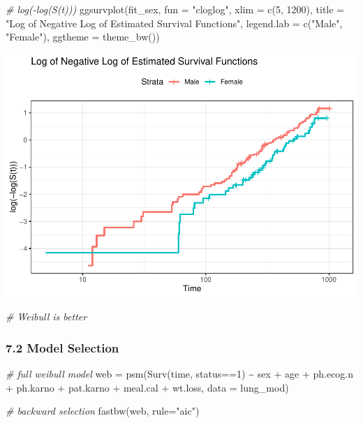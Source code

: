 \documentclass[
]{article}
\newenvironment{Shaded}{\begin{snugshade}}{\end{snugshade}}
\newcommand{\AttributeTok}[1]{\textcolor[rgb]{0.77,0.63,0.00}{#1}}
\newcommand{\CommentTok}[1]{\textcolor[rgb]{0.56,0.35,0.01}{\textit{#1}}}
\newcommand{\DecValTok}[1]{\textcolor[rgb]{0.00,0.00,0.81}{#1}}
\newcommand{\FunctionTok}[1]{\textcolor[rgb]{0.00,0.00,0.00}{#1}}
\newcommand{\NormalTok}[1]{#1}
\newcommand{\OtherTok}[1]{\textcolor[rgb]{0.56,0.35,0.01}{#1}}
\newcommand{\SpecialCharTok}[1]{\textcolor[rgb]{0.00,0.00,0.00}{#1}}
\newcommand{\StringTok}[1]{\textcolor[rgb]{0.31,0.60,0.02}{#1}}
\begin{document}
\begin{Shaded}
\begin{Highlighting}[]
\CommentTok{\# log({-}log(S(t)))}
\FunctionTok{ggsurvplot}\NormalTok{(fit\_sex, }
           \AttributeTok{fun =} \StringTok{"cloglog"}\NormalTok{,}
           \AttributeTok{xlim =} \FunctionTok{c}\NormalTok{(}\DecValTok{5}\NormalTok{, }\DecValTok{1200}\NormalTok{),}
           \AttributeTok{title =} \StringTok{"Log of Negative Log of Estimated Survival Functions"}\NormalTok{,}
           \AttributeTok{legend.lab =} \FunctionTok{c}\NormalTok{(}\StringTok{"Male"}\NormalTok{, }\StringTok{"Female"}\NormalTok{),}
           \AttributeTok{ggtheme =} \FunctionTok{theme\_bw}\NormalTok{())}
\end{Highlighting}
\end{Shaded}

\includegraphics{final_project_files/figure-latex/unnamed-chunk-40-2.pdf}

\begin{Shaded}
\begin{Highlighting}[]
\CommentTok{\# Weibull is better}
\end{Highlighting}
\end{Shaded}

\hypertarget{model-selection}{%
\subsubsection{7.2 Model Selection}\label{model-selection}}

\begin{Shaded}
\begin{Highlighting}[]
\CommentTok{\# full weibull model}
\NormalTok{web }\OtherTok{=} \FunctionTok{psm}\NormalTok{(}\FunctionTok{Surv}\NormalTok{(time, status}\SpecialCharTok{==}\DecValTok{1}\NormalTok{) }\SpecialCharTok{\textasciitilde{}}\NormalTok{ sex }\SpecialCharTok{+}\NormalTok{ age }\SpecialCharTok{+}\NormalTok{ ph.ecog.n }\SpecialCharTok{+}\NormalTok{ ph.karno }\SpecialCharTok{+}\NormalTok{ pat.karno }\SpecialCharTok{+}\NormalTok{ meal.cal }\SpecialCharTok{+}\NormalTok{ wt.loss, }\AttributeTok{data =}\NormalTok{ lung\_mod)}

\CommentTok{\# backward selection}
\FunctionTok{fastbw}\NormalTok{(web, }\AttributeTok{rule=}\StringTok{"aic"}\NormalTok{)}
\end{Highlighting}
\end{Shaded}
\end{document}
